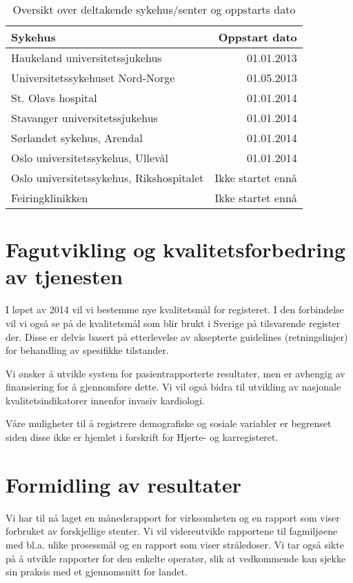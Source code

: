 \documentclass[norsk, a4paper]{report}
\begin{document}
\begin{table}[ht]
\centering
\begin{tabular}{lr}
    \toprule
    Sykehus & Oppstart dato\\
    \midrule
    Haukeland universitetssjukehus & 01.01.2013\\
    Universitetssykehuset Nord-Norge & 01.05.2013\\
    St. Olavs hospital & 01.01.2014\\
    Stavanger universitetssjukehus & 01.01.2014\\
    Sørlandet sykehus, Arendal & 01.01.2014\\
    Oslo universitetssykehus, Ullevål & 01.01.2014\\
    Oslo universitetssykehus, Rikshospitalet & Ikke startet ennå\\
    Feiringklinikken & Ikke startet ennå\\
    \bottomrule
\end{tabular}
\label{tab:oppstart}
\caption{Oversikt over deltakende sykehus/senter og oppstarts dato}
\end{table}



\section{Fagutvikling og kvalitetsforbedring av tjenesten}

I løpet av 2014 vil vi bestemme nye kvalitetsmål for registeret. I den forbindelse vil vi også se på de kvalitetsmål som blir brukt i Sverige på tilsvarende register der.  Disse er delvis basert på etterlevelse av aksepterte guidelines (retningslinjer) for behandling av spesifikke tilstander.   

Vi ønsker å utvikle system for pasientrapporterte resultater, men er avhengig av finansiering for å gjennomføre dette. Vi vil også bidra til utvikling av nasjonale kvalitetsindikatorer innenfor invasiv kardiologi.

Våre muligheter til å registrere demografiske og sosiale variabler er begrenset siden disse ikke er hjemlet i forskrift for Hjerte- og karregisteret.


\section{Formidling av resultater}

Vi har til nå laget en månedsrapport for virksomheten og en rapport som viser forbruket av forskjellige stenter. Vi vil videreutvikle rapportene til fagmiljøene med bl.a. ulike prosessmål og en rapport som viser stråledoser. Vi tar også sikte på å utvikle rapporter for den enkelte operatør, slik at vedkommende kan sjekke sin praksis med et gjennomsnitt for landet.  
\end{document}
